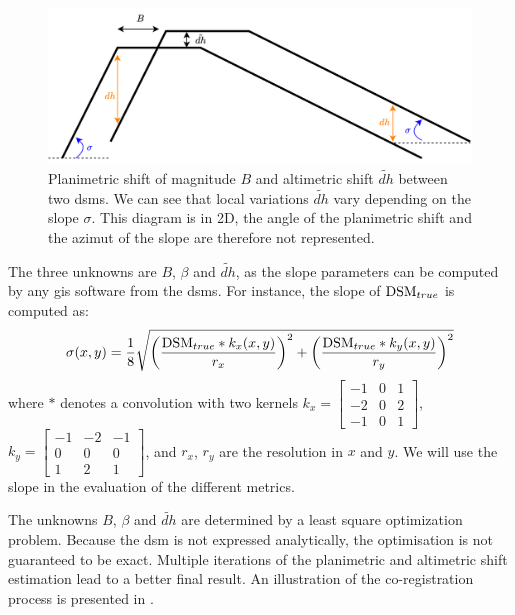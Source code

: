 \begin{figure}[ht!]
    \centering
    \includegraphics[width=\linewidth]{Images/Chap_6/Coregistration.png}
    \caption{Planimetric shift of magnitude $B$ and altimetric shift $\tilde{dh}$ between two \acrshort{dsm}s. We can see that local variations $\tilde{dh}$ vary depending on the slope $\sigma$. This diagram is in 2D, the angle of the planimetric shift and the azimut of the slope are therefore not represented.}
    \label{fig:coregistration}
\end{figure}

The three unknowns are $B$, $\beta$ and $\tilde{dh}$, as the slope parameters can be computed by any \acrshort{gis} software from the \acrshort{dsm}s. For instance, the slope of $\mathrm{DSM}_{true}$ is computed as:
\begin{align}\label{eq:slope}
    \sigma(x,y) = \dfrac{1}{8}\sqrt{\left(\dfrac{\mathrm{DSM}_{true}\ast k_x(x,y)}{r_x}\right)^2 + \left(\dfrac{\mathrm{DSM}_{true}\ast k_y(x,y)}{r_y}\right)^2}
\end{align}
where $\ast$ denotes a convolution with two kernels $k_x=\begin{bmatrix}
-1 & 0 & 1\\
-2 & 0 & 2 \\
-1 & 0 & 1
\end{bmatrix}$, $k_y=\begin{bmatrix}
-1 & -2 & -1\\
0 & 0 & 0 \\
1 & 2 & 1
\end{bmatrix}$, and $r_x$, $r_y$ are the resolution in $x$ and $y$. We will use the slope in the evaluation of the different metrics.

The unknowns $B$, $\beta$ and $\tilde{dh}$ are determined by a least square optimization problem. Because the \acrshort{dsm} is not expressed analytically, the optimisation is not guaranteed to be exact. Multiple iterations of the planimetric and altimetric shift estimation lead to a better final result. An illustration of the co-registration process is presented in .

